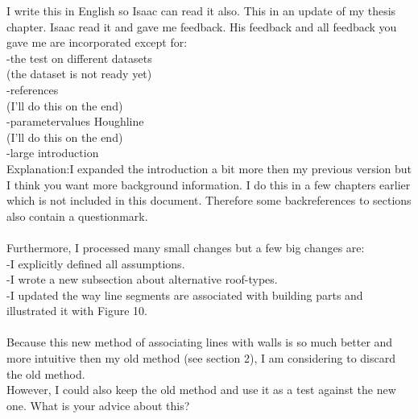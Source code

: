 I write this in English so Isaac can read it also.
This in an update of my thesis chapter. Isaac read it and gave me feedback. His feedback and all feedback you gave me are incorporated except for:\\
-the test on different datasets\\
(the dataset is not ready yet)\\
-references\\
(I'll do this on the end)\\
-parametervalues Houghline\\
(I'll do this on the end)\\
-large introduction\\
Explanation:I expanded the introduction a bit more then my previous version but I think you
want more background information. I do this in a few chapters earlier which is
not included in this document. Therefore some backreferences to sections also
contain a questionmark.\\
\\
Furthermore, I processed many small changes but a few big changes are:\\
-I explicitly defined all assumptions.\\
-I wrote a new subsection about alternative roof-types.\\
-I updated the way line segments are associated with building parts and illustrated it with Figure 10.\\
\\
Because this new method of associating lines with walls is so much better and
more intuitive then my old method (see section 2), I am considering to
discard the old method.\\ 
However, I could also keep the old method and use it as
a test against the new one. What is your advice about this?\\

